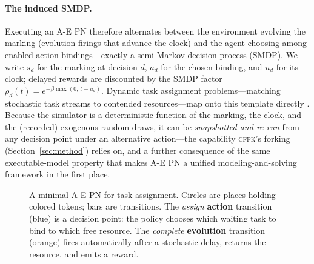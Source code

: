 \documentclass[review,authoryear,3p,times]{elsarticle}
\newcommand{\cfpk}{\textsc{cfpk}}
\begin{document}
\paragraph{The induced SMDP.} Executing an A-E PN therefore alternates between the
environment evolving the marking (evolution firings that advance the clock) and
the agent choosing among enabled action bindings---exactly a semi-Markov decision
process (SMDP). We write $s_d$ for the marking at decision $d$, $a_d$ for the
chosen binding, and $u_d$ for its clock; delayed rewards are discounted by the
SMDP factor $\rho_d(t)=e^{-\beta\max(0,\,t-u_d)}$. Dynamic task assignment
problems---matching stochastic task streams to contended resources---map onto
this template directly \citep{aepn2023,aepn_repr2025,gympn2025}. Because the
simulator is a deterministic function of the marking, the clock, and the
(recorded) exogenous random draws, it can be \emph{snapshotted and re-run}
from any decision point under an alternative action---the capability
\cfpk{}'s forking (Section~\ref{sec:method}) relies on, and a further
consequence of the same executable-model property that makes A-E PN a
unified modeling-and-solving framework in the first place.

\begin{figure}[t]
\centering
{}
\caption{A minimal A-E PN for task assignment. Circles are places holding colored
tokens; bars are transitions. The \emph{assign} \textbf{action} transition
(blue) is a decision point: the policy chooses which waiting task to bind to which
free resource. The \emph{complete} \textbf{evolution} transition (orange) fires
automatically after a stochastic delay, returns the resource, and emits a reward.}
\label{fig:aepn}
\end{figure}
\end{document}
